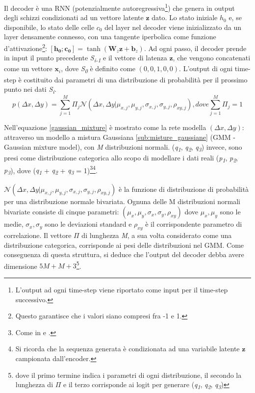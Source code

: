 Il decoder è una RNN (potenzialmente autoregressiva\footnote{L'output ad ogni time-step viene riportato come input per il time-step successivo.}) che genera in output degli schizzi condizionati ad un vettore latente $\boldsymbol{z}$ dato. Lo stato iniziale $h_0$ e, se disponibile, lo stato delle celle $c_0$ del layer nel decoder viene inizializzato da un layer densamente connesso, con una tangente iperbolica come funzione d'attivazione\footnote{Questo garantisce che i valori siano compresi fra -1 e 1.}: $[\boldsymbol{h_0} ; \boldsymbol{c_0}] = \tanh(\boldsymbol{W}_z \boldsymbol{z} + \boldsymbol{b}_z)$.
Ad ogni passo, il decoder prende in input il punto precedente \textit{S\textsubscript{i-1}} e il vettore di latenza $\boldsymbol{z}$, che vengono concatenati come un vettore $\boldsymbol{x}_i$, dove \textit{S\textsubscript{0}} è definito come $(0, 0, 1, 0, 0)$. L'output di ogni time-step è costituito dai parametri di una distribuzione di probabilità per il prossimo punto nei dati \textit{S\textsubscript{i}}.
\begin{equation}
	\label{gaussian_mixture}
	p(\Delta x, \Delta y) = \sum_{j=1}^M \Pi_j \mathcal{N}(\Delta x, \Delta y | \mu_{x,j}, \mu_{y,j}, \sigma_{x,j}, \sigma_{y,j}, \rho_{xy, j}), dove \sum_{j=1}^M \Pi_j = 1
\end{equation}

Nell'equazione \ref{gaussian_mixture} è mostrato come la rete modella $(\Delta x, \Delta y)$: attraverso un modello a mistura Gaussiana \ref{sub:misture_gaussiane} (GMM - Gaussian mixture model), con \textit{M} distribuzioni normali\cite{gmm}. (\textit{q\textsubscript{1}}, \textit{q\textsubscript{2}}, \textit{q\textsubscript{3}}) invece, sono presi come distribuzione categorica allo scopo di modellare i dati reali (\textit{p\textsubscript{1}}, \textit{p\textsubscript{2}}, \textit{p\textsubscript{3}}), dove (\textit{q\textsubscript{1}} + \textit{q\textsubscript{2}} + \textit{q\textsubscript{3}} = 1)\footnote{Come in \cite{fake_chinese} e \cite{draw_chinese}.}\footnote{Si ricorda che la sequenza generata è condizionata ad una variabile latente $\boldsymbol{z}$ campionata dall'encoder.}.

$\mathcal{N}(\Delta x, \Delta y | \mu_{x,j}, \mu_{y,j}, \sigma_{x,j}, \sigma_{y,j}, \rho_{xy, j})$ è la funzione di distribuzione di probabilità per una distribuzione normale bivariata. Ognuna delle M distribuzioni normali bivariate consiste di cinque parametri: $(\mu_{x}, \mu_{y}, \sigma_{x}, \sigma_{y}, \rho_{xy})$ dove $\mu_{x}, \mu_{y}$ sono le medie, $\sigma_{x}, \sigma_{y}$ sono le deviazioni standard e $\rho_{xy}$ è il corrispondente parametro di correlazione. Il vettore $\Pi$ di lunghezza \textit{M}, a sua volta considerato come una distribuzione categorica, corrisponde ai pesi delle distribuzioni nel GMM. Come conseguenza di questa struttura, si deduce che l'output del decoder debba avere dimensione $5M + M + 3$\footnote{dove il primo termine indica i parametri di ogni distribuzione, il secondo la lunghezza di $\Pi$ e il terzo corrisponde ai logit per generare (\textit{q\textsubscript{1}}, \textit{q\textsubscript{2}}, \textit{q\textsubscript{3}})}.

